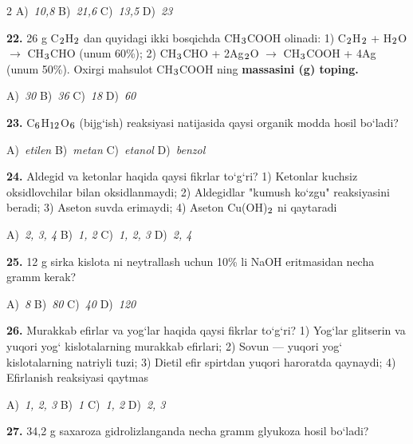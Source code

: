 \documentclass[11pt,a4paper]{article}
\renewcommand{\textsubscript}[1]{\ensuremath{_{\text{\fontsize{8}{8}\selectfont #1}}}}
\begin{document}
\begin{multicols}{2}
\noindent A)~\textsl{10,8} \hfill B)~\textsl{21,6} \hfill C)~\textsl{13,5} \hfill D)~\textsl{23}\par
\vspace{4pt}
\noindent\textbf{22.} 26 g C\textsubscript{2}H\textsubscript{2} dan quyidagi ikki bosqichda CH\textsubscript{3}COOH olinadi: 1) C\textsubscript{2}H\textsubscript{2} + H\textsubscript{2}O $\to$ CH\textsubscript{3}CHO (unum 60\%); 2) CH\textsubscript{3}CHO + 2Ag\textsubscript{2}O $\to$ CH\textsubscript{3}COOH + 4Ag (unum 50\%). Oxirgi mahsulot CH\textsubscript{3}COOH ning \textbf{massasini (g) toping.}

\noindent A)~\textsl{30} \hfill B)~\textsl{36} \hfill C)~\textsl{18} \hfill D)~\textsl{60}\par
\vspace{4pt}
\noindent\textbf{23.} C\textsubscript{6}H\textsubscript{12}O\textsubscript{6} (bijg`ish) reaksiyasi natijasida qaysi organik modda hosil bo`ladi?

\noindent A)~\textsl{etilen} \hfill B)~\textsl{metan} \hfill C)~\textsl{etanol} \hfill D)~\textsl{benzol}\par
\vspace{4pt}
\noindent\textbf{24.} Aldegid va ketonlar haqida qaysi fikrlar to`g`ri? 1) Ketonlar kuchsiz oksidlovchilar bilan oksidlanmaydi; 2) Aldegidlar "kumush ko`zgu" reaksiyasini beradi; 3) Aseton suvda erimaydi; 4) Aseton Cu(OH)\textsubscript{2} ni qaytaradi

\noindent A)~\textsl{2, 3, 4} \hfill B)~\textsl{1, 2} \hfill C)~\textsl{1, 2, 3} \hfill D)~\textsl{2, 4}\par
\vspace{4pt}
\noindent\textbf{25.} 12 g sirka kislota ni neytrallash uchun 10\% li NaOH eritmasidan necha gramm kerak?

\noindent A)~\textsl{8} \hfill B)~\textsl{80} \hfill C)~\textsl{40} \hfill D)~\textsl{120}\par
\vspace{4pt}
\noindent\textbf{26.} Murakkab efirlar va yog`lar haqida qaysi fikrlar to`g`ri? 1) Yog`lar glitserin va yuqori yog` kislotalarning murakkab efirlari; 2) Sovun --- yuqori yog` kislotalarning natriyli tuzi; 3) Dietil efir spirtdan yuqori haroratda qaynaydi; 4) Efirlanish reaksiyasi qaytmas

\noindent A)~\textsl{1, 2, 3} \hfill B)~\textsl{1} \hfill C)~\textsl{1, 2} \hfill D)~\textsl{2, 3}\par
\vspace{4pt}
\noindent\textbf{27.} 34,2 g saxaroza gidrolizlanganda necha gramm glyukoza hosil bo`ladi?


\end{multicols}
\end{document}
